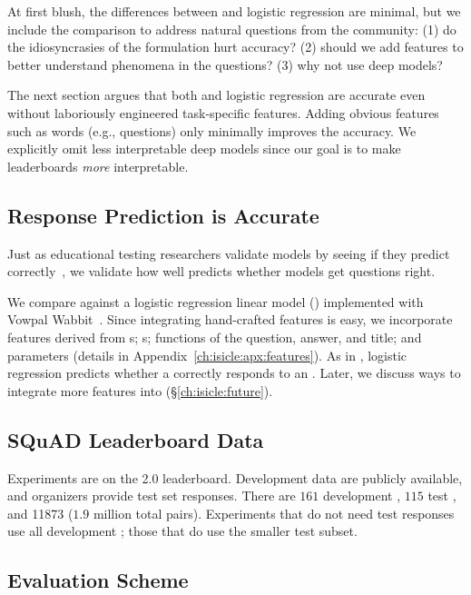 At first blush, the differences between \irt{} and logistic regression
are minimal, but we include the comparison to address natural
questions from the  community:
(1) do the idiosyncrasies of the \irt{} formulation hurt
accuracy?
(2) should we add features to better understand phenomena
in the questions?
(3) why not use deep models?

The next section argues that both \irt{} and logistic regression are
accurate even without laboriously engineered task-specific features.
Adding obvious features such as \itm{} words (e.g., questions)
only minimally improves the accuracy.
We explicitly omit less interpretable deep models since our goal is to
make leaderboards \emph{more} interpretable.

\subsection{Response Prediction is Accurate}
\label{ch:isicle:irt-accurate}

Just as educational testing researchers validate \irt{} models by
seeing if they predict \subj{} \resps{}
correctly~\citep{aera2014standards}, we validate how well \name{} predicts
whether \squad{} models get questions right.

We compare against a logistic regression linear model ()
implemented with Vowpal Wabbit~\citep{Agarwal2014ARE}.
Since integrating hand-crafted features is easy, we incorporate
features derived from \subj{} s; \itm{} s; functions
of the \squad{} question, answer, and title; and \irt{} parameters
(details in Appendix~\ref{ch:isicle:apx:features}).
As in \irt{}, logistic regression predicts whether a \subj{} correctly
responds to an \itm{}.
Later, we discuss ways to integrate more features into \irt{}
(\S\ref{ch:isicle:future}).

\subsection{SQuAD Leaderboard Data}
\label{ch:isicle:datasets}
Experiments are on the \squad{} 2.0 leaderboard.
Development data are publicly available, and organizers provide test set responses.
There are $161$ development \subjs{}, $115$ test \subjs{}, and \num[group-separator={,}]{11873} \itms{} ($1.9$ million total pairs).
Experiments that do not need test responses use all development \subjs{}; those that do use the smaller test subset.

\subsection{Evaluation Scheme}

